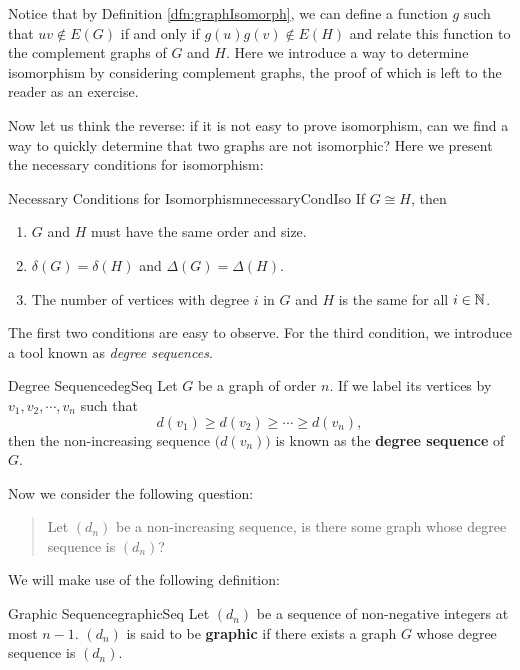 \documentclass[math]{amznotes}
\makeatletter
\let\save@mathaccent\mathaccent
\newcommand*\if@single[3]{%
  \setbox0\hbox{${\mathaccent"0362{#1}}^H$}%
  \setbox2\hbox{${\mathaccent"0362{\kern0pt#1}}^H$}%
  \ifdim\ht0=\ht2 #3\else #2\fi
  }
\newcommand*\rel@kern[1]{\kern#1\dimexpr\macc@kerna}
\newcommand*\widebar[1]{\@ifnextchar^{{\wide@bar{#1}{0}}}{\wide@bar{#1}{1}}}
\newcommand*\wide@bar[2]{\if@single{#1}{\wide@bar@{#1}{#2}{1}}{\wide@bar@{#1}{#2}{2}}}
\newcommand*\wide@bar@[3]{%
  \begingroup
  \def\mathaccent##1##2{%
    \let\mathaccent\save@mathaccent
    \if#32 \let\macc@nucleus\first@char \fi
    \setbox\z@\hbox{$\macc@style{\macc@nucleus}_{}$}%
    \setbox\tw@\hbox{$\macc@style{\macc@nucleus}{}_{}$}%
    \dimen@\wd\tw@
    \advance\dimen@-\wd\z@
    \divide\dimen@ 3
    \@tempdima\wd\tw@
    \advance\@tempdima-\scriptspace
    \divide\@tempdima 10
    \advance\dimen@-\@tempdima
    \ifdim\dimen@>\z@ \dimen@0pt\fi
    \rel@kern{0.6}\kern-\dimen@
    \if#31
      \overline{\rel@kern{-0.6}\kern\dimen@\macc@nucleus\rel@kern{0.4}\kern\dimen@}%
      \advance\dimen@0.4\dimexpr\macc@kerna
      \let\final@kern#2%
      \ifdim\dimen@<\z@ \let\final@kern1\fi
      \if\final@kern1 \kern-\dimen@\fi
    \else
      \overline{\rel@kern{-0.6}\kern\dimen@#1}%
    \fi
  }%
  \macc@depth\@ne
  \let\math@bgroup\@empty \let\math@egroup\macc@set@skewchar
  \mathsurround\z@ \frozen@everymath{\mathgroup\macc@group\relax}%
  \macc@set@skewchar\relax
  \let\mathaccentV\macc@nested@a
  \if#31
    \macc@nested@a\relax111{#1}%
  \else
    \def\gobble@till@marker##1\endmarker{}%
    \futurelet\first@char\gobble@till@marker#1\endmarker
    \ifcat\noexpand\first@char A\else
      \def\first@char{}%
    \fi
    \macc@nested@a\relax111{\first@char}%
  \fi
  \endgroup
}
\theoremstyle{remark}
\newcommand{\0}{\mathbf{0}}
\newcommand{\1}{\mathbf{1}}
\makeatother
\begin{document}
Notice that by Definition \ref{dfn:graphIsomorph}, we can define a function $g$ such that $uv \notin E(G)$ if and only if $g(u)g(v) \notin E(H)$ and relate this function to the complement graphs of $G$ and $H$. Here we introduce a way to determine isomorphism by considering complement graphs, the proof of which is left to the reader as an exercise.
Now let us think the reverse: if it is not easy to prove isomorphism, can we find a way to quickly determine that two graphs are not isomorphic? Here we present the necessary conditions for isomorphism:
\begin{thmbox}{Necessary Conditions for Isomorphism}{necessaryCondIso}
    If $G \cong H$, then
    \begin{enumerate}
        \item $G$ and $H$ must have the same order and size.
        \item $\delta(G) = \delta(H)$ and $\Delta(G) = \Delta(H)$.
        \item The number of vertices with degree $i$ in $G$ and $H$ is the same for all $i \in \mathbb{N}$.
    \end{enumerate}
\end{thmbox}
The first two conditions are easy to observe. For the third condition, we introduce a tool known as \textit{degree sequences}.
\begin{dfnbox}{Degree Sequence}{degSeq}
    Let $G$ be a graph of order $n$. If we label its vertices by $v_1, v_2, \cdots, v_n$ such that
    \begin{equation*}
        d(v_1) \geq d(v_2) \geq \cdots \geq d(v_n),
    \end{equation*}
    then the non-increasing sequence $\bigl(d(v_n)\bigr)$ is known as the {\color{red} \textbf{degree sequence}} of $G$.
\end{dfnbox}
Now we consider the following question:
\begin{quote}
    Let $(d_n)$ be a non-increasing sequence, is there some graph whose degree sequence is $(d_n)$?
\end{quote}
We will make use of the following definition:
\begin{dfnbox}{Graphic Sequence}{graphicSeq}
    Let $(d_n)$ be a sequence of non-negative integers at most $n - 1$. $(d_n)$ is said to be {\color{red} \textbf{graphic}} if there exists a graph $G$ whose degree sequence is $(d_n)$.
\end{dfnbox}
\end{document}
